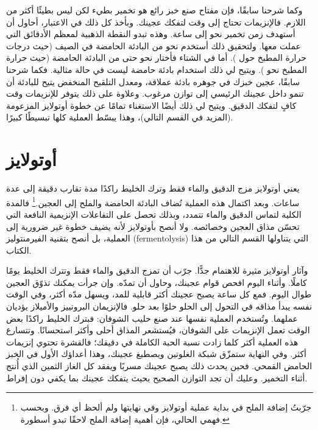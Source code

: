 وكما شرحنا سابقًا، فإن مفتاح صنع خبز رائع هو تخمير بطيء لكن ليس بطيئًا أكثر من اللازم. فالإنزيمات تحتاج إلى وقت لتفكك عجينك. وبأخذ كل ذلك في الاعتبار، أحاول أن أستهدف زمن تخمير نحو  إلى  ساعة. وهذه تبدو النقطة الذهبية لمعظم الأدقائق التي عملت معها. ولتحقيق ذلك أستخدم نحو  من البادئة الحامضة في الصيف (حيث درجات حرارة المطبخ حول ). أما في الشتاء فأختار نحو  حتى  من البادئة الحامضة (حيث حرارة المطبخ نحو ). ويتيح لي ذلك استخدام بادئة حامضة ليست في حالة مثالية. فكما شرحنا سابقًا، عجين خبزك في جوهره بادئة عملاقة، ومعدل التلقيح المنخفض يتيح للبادئة أن تنمو داخل عجينك الرئيسي إلى توازن مرغوب. وعلاوة على ذلك يتوفر للإنزيمات وقت كافٍ لتفكك الدقيق. ويتيح لي ذلك أيضًا الاستغناء تمامًا عن خطوة أوتولايز المزعومة (المزيد في القسم التالي)، وهذا يبسّط العملية كلها تبسيطًا كبيرًا.

\section{أوتولايز}%
\label{sec:autolysis}

يعني أوتولايز مزج الدقيق والماء فقط وترك الخليط راكدًا مدة تقارب  دقيقة إلى عدة ساعات. وبعد اكتمال هذه العملية تُضاف البادئة الحامضة والملح إلى العجين.\footnote{جرّبتُ إضافة الملح في بداية عملية أوتولايز وفي نهايتها ولم ألحظ أي فرق. وبحسب فهمي الحالي، فإن أهمية إضافة الملح لاحقًا تبدو أسطورة.} فالمدة الكلية لتماس الدقيق والماء تتمدد، وبذلك تحصل على التفاعلات الإنزيمية النافعة التي تحسّن مذاق العجين وخصائصه. ولا أنصح بأوتولايز لأنه يضيف خطوة غير ضرورية إلى العملية، بل أنصح بتقنية الفيرمنتوليز \textenglish{(fermentolysis)} التي يتناولها القسم التالي من هذا الكتاب.

وآثار أوتولايز مثيرة للاهتمام جدًّا. جرّب أن تمزج الدقيق والماء فقط وتترك الخليط يومًا كاملًا. وأثناء اليوم افحص قوام عجينك، وحاول أن تمدّه. وإن جرأت يمكنك تذوّق العجين طوال اليوم. فمع كل ساعة يصبح عجينك أكثر قابلية للمد، ويسهل مدّه أكثر، وفي الوقت نفسه يبدأ مذاقه في التحول إلى الحلو حلوًا بعد حلو. فالإنزيمان البروتييز والأميلاز يؤديان عملهما. وتُستخدم العملية نفسها عند صنع حليب الشوفان: فبترك الخليط راكدًا بعض الوقت تعمل الإنزيمات على الشوفان، فيُستشعر المذاق أحلى وأكثر استحسانًا. وتتسارع هذه العملية أكثر كلما زادت نسبة الحبة الكاملة في دقيقك؛ فالقشرة تحتوي إنزيمات أكثر. وفي النهاية ستمزّق شبكة الغلوتين ويصطبغ عجينك، وهذا أعداؤك الأول في الخبز الحامض القمحي. فحين يحدث ذلك يصبح عجينك مسربًا ويفقد كل الغاز الثمين الذي أُنتج أثناء التخمير. وعليك أن تجد التوازن الصحيح بحيث يتفكك عجينك بما يكفي دون إفراط.

